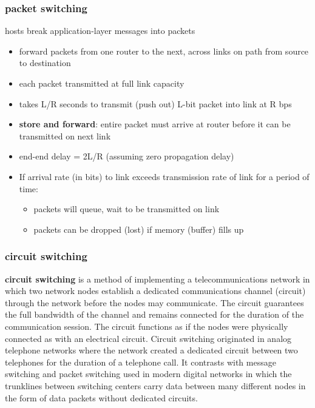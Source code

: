 \documentclass[a4paper,12pt]{article}
\begin{document}
\subsubsection{packet switching}
\label{sec:org61ffd09}
hosts break application-layer messages into packets\\
\begin{itemize}
\item forward packets from one router to the next, across links on path from source to destination\\
\item each packet transmitted at full link capacity\\
\item takes L/R seconds to transmit (push out) L-bit packet into link at R bps\\
\item \textbf{store and forward}: entire packet must  arrive at router before it can be transmitted on next link\\
\item end-end delay = 2L/R (assuming zero propagation delay)\\
\item If arrival rate (in bits) to link exceeds transmission rate of link for a period of time:\\
\begin{itemize}
\item packets will queue, wait to be transmitted on link\\
\item packets can be dropped (lost) if memory (buffer) fills up\\
\end{itemize}
\end{itemize}
\subsubsection{circuit switching}
\label{sec:org64acb9c}
\textbf{circuit switching} is a method of implementing a telecommunications network in which two network nodes establish a dedicated communications channel (circuit) through the network before the nodes may communicate. The circuit guarantees the full bandwidth of the channel and remains connected for the duration of the communication session. The circuit functions as if the nodes were physically connected as with an electrical circuit. Circuit switching originated in analog telephone networks where the network created a dedicated circuit between two telephones for the duration of a telephone call. It contrasts with message switching and packet switching used in modern digital networks in which the trunklines between switching centers carry data between many different nodes in the form of data packets without dedicated circuits.\\
\end{document}
